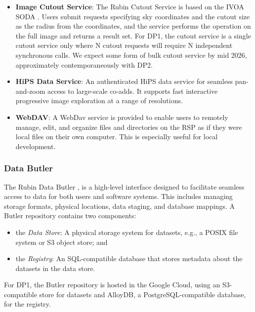 \begin{itemize}
\vspace{0.1cm}
\item \textbf{Image Cutout Service}: The Rubin Cutout Service \citep{SQR-063, SQR-093} is based on the  \gls{IVOA} SODA \citep[Server-side Operations for Data Access;][]{2017ivoa.spec.0517B}.
Users submit requests specifying sky coordinates and the cutout size as the radius from the coordinates, and the  service performs the operation on the full image and returns a result set.
For \gls{DP1}, the  cutout service is a single cutout service only where N cutout requests will require N independent synchronous calls.
We expect some form of bulk cutout service by mid 2026, approximately contemporaneously with \gls{DP2}.

\vspace{0.1cm}
\item \textbf{HiPS Data Service}: An authenticated \gls{HiPS}
\citep{2017ivoa.spec.0519F}
data service for seamless pan-and-zoom access to large-scale co-adds.
It supports fast interactive progressive image exploration at a range of resolutions.

\vspace{0.1cm}
\item \textbf{WebDAV}: A \gls{WebDav} service is provided to enable users to remotely manage, edit, and organize files and directories on the \gls{RSP} as if they were local files on their own computer. This is especially useful for local development.
\end{itemize}

\subsubsection{Data Butler}
\label{sssec:data_butler}

The Rubin Data Butler \citep{2022SPIE12189E..11J,2023arXiv230303313L},  is a high-level interface designed to facilitate seamless access to data for both users and software systems.
This includes managing storage formats, physical locations, data staging, and database mappings.
A \gls{Butler} repository contains two components:
\begin{itemize}
    \item the \emph{Data Store}: A physical storage system for datasets, e.g., a \gls{POSIX} file system or S3 object store; and
    \item the \emph{Registry}: An \gls{SQL}-compatible database that stores metadata about the datasets in the data store.
\end{itemize}
For DP1, the Butler repository is hosted in the Google Cloud, using an \gls{S3}-compatible store for datasets and AlloyDB, a PostgreSQL-compatible database, for the registry.

